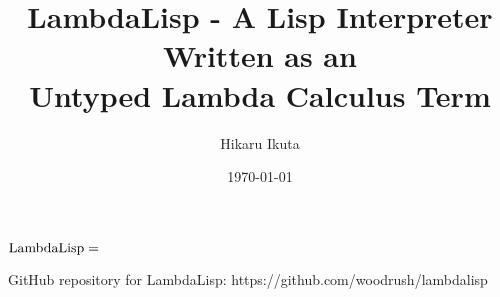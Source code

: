 \documentclass[article, 12pt]{article}
\title{LambdaLisp - A Lisp Interpreter Written as an \\ Untyped Lambda Calculus Term}
\author{Hikaru Ikuta}
\date{\today}
\begin{document}
\maketitle
${\rm LambdaLisp} =$

\begin{thebibliography}{A99}
     GitHub repository for LambdaLisp: https://github.com/woodrush/lambdalisp
\end{thebibliography}
\end{document}
